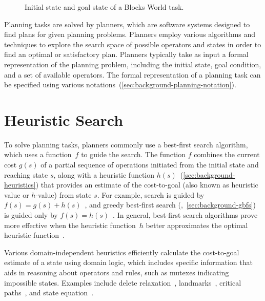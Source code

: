 \documentclass[ppgc,diss,english]{iiufrgs}
\begin{document}
\begin{figure}[ht]
\caption[Initial state of a Blocks World task]{Initial state and goal state of a Blocks World task.}
\vspace{\baselineskip}
\centering
{}
\label{fig:intro-blocks}
\end{figure}

Planning tasks are solved by planners, which are software systems designed to find plans for given planning problems. Planners employ various algorithms and techniques to explore the search space of possible operators and states in order to find an optimal or satisfactory plan. Planners typically take as input a formal representation of the planning problem, including the initial state, goal condition, and a set of available operators. The formal representation of a planning task can be specified using various notations~(\cref{sec:background-planning-notation}).

\section{Heuristic Search}
\label{sec:intro-heuristic-search}
To solve planning tasks, planners commonly use a best-first search algorithm, which uses a function~$f$ to guide the search. The function $f$ combines the current cost $g(s)$ of a partial sequence of operations initiated from the initial state and reaching state $s$, along with a heuristic function $h(s)$~(\cref{sec:background-heuristics}) that provides an estimate of the cost-to-goal (also known as heuristic value or $h$-value) from state $s$. For example, \astar search is guided by $f(s)=g(s)+h(s)$~\cite{hart-et-al-ieeessc1968}, and greedy best-first search (\gbfs,~\cref{sec:background-gbfs}) is guided only by $f(s)=h(s)$~\cite{doran-michie-rsl1966}. In general, best-first search algorithms prove more effective when the heuristic function~$h$ better approximates the optimal heuristic function~\hstar.

Various domain-independent heuristics efficiently calculate the cost-to-goal estimate of a state using domain logic, which includes specific information that aids in reasoning about operators and rules, such as mutexes indicating impossible states. Examples include delete relaxation~\cite{Hoffmann.Nebel/2001}, landmarks~\cite{hoffmann-et-al-jair2004,Karpas.Domshlak/2009}, critical paths~\cite{haslum-geffner-aips2000}, and state equation~\cite{bonet-ijcai2013}.
\end{document}
